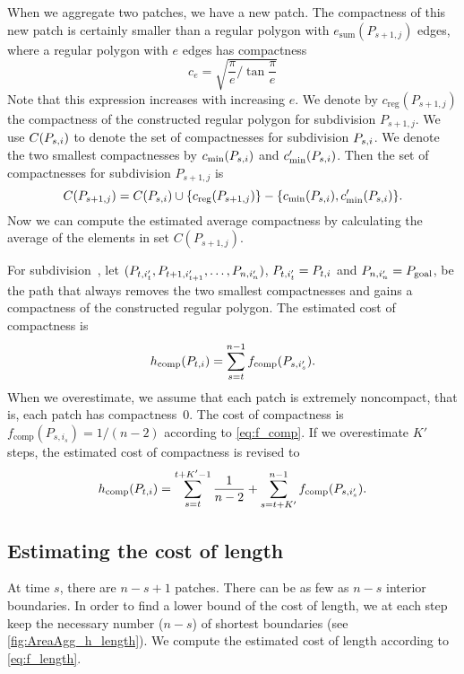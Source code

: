 When we aggregate two patches, we have a new patch.
The compactness of this new patch is certainly smaller than 
a regular polygon with $e_\mathrm{sum}(P_{s+1,j})$ edges,
where a regular polygon with $e$ edges has compactness
\[
c_e=\sqrt{\frac{\pi}{e}\bigg/\tan{\frac{\pi}{e}}}
\]
Note that this expression increases with increasing $e$.
We denote by $c_\mathrm{reg} (P_{s+1,j})$ the compactness 
of the constructed regular polygon for subdivision 
$P_{s+1,j}$.
We use $C(P_{s,i})$ to denote the set of compactnesses for 
subdivision $P_{s,i}$.
We denote the two smallest compactnesses by 
$c_\mathrm{min}(P_{s,i})$ and $c'_\mathrm{min}(P_{s,i})$.
Then the set of compactnesses for subdivision $P_{s+1,j}$ is 
\begin{equation}
\label{eq:compsetnew}
C(P_{s+1,j})=C(P_{s,i}) 
\cup \{c_\mathrm{reg} (P_{s+1,j})\} 
- \{c_\mathrm{min}(P_{s,i}), c'_\mathrm{min}(P_{s,i})\}.
\end{equation}
Now we can compute the estimated average compactness by 
calculating the average 
of the elements in set $C(P_{s+1,j})$.

For subdivision~\Pnode, let
$(P_{t,i'_t}, P_{t+1,i'_{t+1}}, \dots,P_{n,i'_n})$, 
$P_{t,i'_t}=P_{t,i}$ and $P_{n,i'_n}=P_\mathrm{goal}$,
be the path that always removes the two smallest compactnesses
and gains a compactness of the constructed regular polygon.
The estimated cost of compactness is
\begin{equation}
\label{eq:h_comp}
h_\mathrm{comp}(P_{t,i})=
\sum_{s=t}^{n-1}f_\mathrm{comp}(P_{s,i'_s}).
\end{equation}
When we overestimate, 
we assume that each patch is extremely noncompact,
that is, each patch has compactness~$0$.
The cost of compactness is $f_\mathrm{comp}(P_{s,i_s})=1/(n-2)$
according to \eq\ref{eq:f_comp}.
If we overestimate $K'$ steps, 
the estimated cost of compactness is revised to
\begin{equation}
\label{eq:o_comp}
h_\mathrm{comp}(P_{t,i})=
\sum_{s=t}^{t+K'-1}\frac{1}{n-2}+
\sum_{s=t+K'}^{n-1}f_\mathrm{comp}(P_{s,i'_s}).
\end{equation}



\subsection{Estimating the cost of length}
\label{sec:AreaAgg_h_length}

At time $s$, there are $n-s+1$ patches.
There can be as few as $n-s$ interior boundaries.
In order to find a lower bound of the cost of length,
we at each step keep the necessary number ($n-s$) of shortest  
boundaries
(see \fig\ref{fig:AreaAgg_h_length}).
We compute the estimated cost of length according to 
\eq\ref{eq:f_length}.

